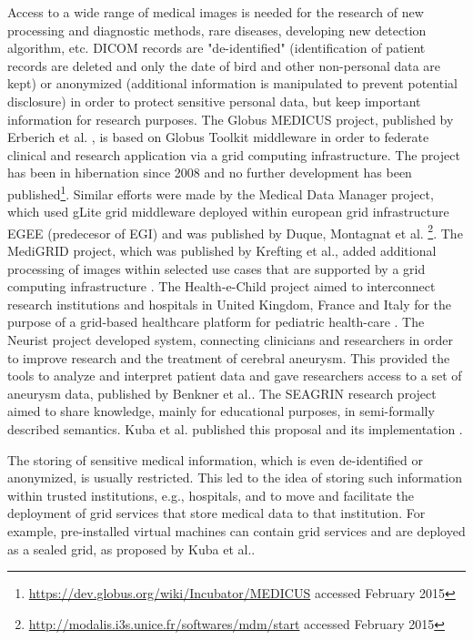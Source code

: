 Access to a wide range of medical images is needed for the research of new processing and diagnostic methods, rare diseases, developing new detection algorithm, etc.  DICOM records are "de-identified" (identification of patient records are deleted and only the date of bird and other non-personal data are kept) or anonymized (additional information is manipulated to prevent potential disclosure) in order to protect sensitive personal data, but keep important information for research purposes. The Globus MEDICUS project, published by Erberich et al. \cite{Erberich2006,Erberich2007}, is based on Globus Toolkit middleware in order to federate clinical and research application via a grid computing infrastructure. The project has been in hibernation since 2008 and no further development has been published\footnote{\url{https://dev.globus.org/wiki/Incubator/MEDICUS} accessed February 2015}. Similar efforts were made by the Medical Data Manager project, which used gLite grid middleware deployed within european grid infrastructure EGEE (predecesor of EGI) and was published by Duque, Montagnat et al.\cite{Duque,Montagnat2007} \footnote{\url{http://modalis.i3s.unice.fr/softwares/mdm/start} accessed February 2015}. The MediGRID project, which was published by Krefting et al.\cite{Krefting2009}, added additional processing of images within selected use cases that are supported by a grid computing infrastructure \cite{Krefting2010}. The Health-e-Child project aimed to interconnect research institutions and hospitals in United Kingdom, France and Italy for the purpose of a grid-based healthcare platform for pediatric health-care \cite{Skaburskas2008}. The Neurist project developed system, connecting  clinicians and researchers in order to improve research and the treatment of cerebral aneurysm. This provided the tools to analyze and interpret patient data and gave researchers access to a set of aneurysm data, published by Benkner et al.\cite{Benkner2010}.
The SEAGRIN research project aimed to share knowledge, mainly for educational purposes, in semi-formally described semantics. Kuba et al. published this proposal and its implementation \cite{Kuba2006}. 

The storing of sensitive medical information, which is even de-identified or anonymized, is usually restricted. This led to the idea of storing such information within trusted institutions, e.g., hospitals, and to move and facilitate the deployment of grid services that store medical data to that institution. For example, pre-installed virtual machines can contain grid services and are deployed as a sealed grid, as proposed by Kuba et al.\cite{Kuba2007a}.


